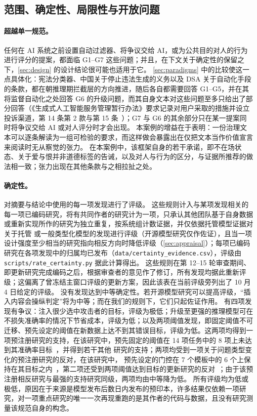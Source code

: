 \subsection{范围、确定性、局限性与开放问题}
\label{sec:scope-certainty}

\paragraph{超越单一规范。}
任何在 AI 系统之前设置自动过滤器、将争议交给 AI，或为公共目的对人的行为进行评分的提案，都面临 G1--G7 这些问题；并且，在下文关于确定性的保留之下，\cref{sec:design} 的设计结论很可能也适用于它。
\cref{sec:paradigms} 中的比较使这一点具体化：宪法分类器、中国关于停止违法生成的义务以及 DSA 关于自动化手段的条款，都在朝推理期拦截层的方向推进，随后各自都需要回答 G1--G5，并在其将监督自动化之处回答 G6 的升级问题，而其自身文本对这些问题至多只给出了部分回答（《生成式人工智能服务管理暂行办法》要求记录对用户采取的措施并设立投诉渠道，第 14 条第 2 款与第 15 条~\cite{cac2023genai}）；G7 与 G6 的其余部分只在某一提案同时将争议交给 AI 或对人评分时才会出现。
本案例的增益在于表明：一份治理文本可以逐条解读为一组可检验的要求，而这样做会暴露出在仅把文本当作价值宣言来阅读时无从察觉的张力。
在本案例中，该框架自身的若干承诺，即不在场状态、关于爱与恨并非道德标签的告诫，以及对人与行为的区分，与证据所推荐的做法相一致；张力出现在其他条款与之相拉扯之处。

\paragraph{确定性。}
 对摘要与结论中使用的每一项发现进行了评级。
这些规则计入与某项发现相关的每一项已编码研究，将有共同作者的研究计为一项，只承认其他团队基于自身数据或重新实现所作的研究为独立重复，按系统组计数证据，并仅依据托管模型证据对关于托管 \jev{} 或一般类型化模型的发现进行评级（开源模型研究仅作佐证），且当一项设计强度至少相当的研究指向相反方向时降低评级（\cref{sec:appraisal}）；每项已编码研究在各项发现中的归属均已发布（\nolinkurl{data/certainty_evidence.csv}），评级由 \nolinkurl{scripts/rate_certainty.py} 据此计算得出。
这些规则在第 12--15 轮审查期间、即更新研究完成编码之后，根据审查者的意见作了修订，所有发现均据此重新评级；这偏离了曾冻结主窗口评级的更新方案，因此该表在当前评级旁列出了 10 月 4 日给定的评级。
没有发现达到中等确定性。若开源模型研究可以提高评级，“插入内容会操纵判定”将为中等；而在我们的规则下，它们只起佐证作用。
有四项发现有争议：注入很少选中攻击者的目标，评级为极低；升级至更强的推理模型可在不损失准确率的情况下节省成本，评级为低；以及两项阈值发现，即固定阈值不可迁移、预先设定的阈值在新数据上达不到其错误目标，评级为低。这两项均得到一项预注册研究的支持，在该研究中，预先固定的阈值在 14 项任务中的 8 项上未达到其准确率目标~\cite{arx24574}，并得到若干其他 \jev{} 研究的支持；两项均受到一项关于问题类型变化的预注册研究的反对，在该研究中，\jev{} 预先设定的门控在 7 个模板中的 6 个上保持在其目标之内~\cite{arx33689}，第二项还受到两项阈值达到目标的更新研究的反对~\cite{zen22935043,zen23075657}\zmark{}；由于该预注册相反研究与最强的支持研究同级，两项均由中等降为低。
所有评级均为低或极低，原因在于来源是模型发布后数日内发布的预印本，许多结果仅依赖一项研究，对一项重点研究的唯一一次再现重跑的是其作者的代码与数据，且没有研究测量该规范自身的构念。

